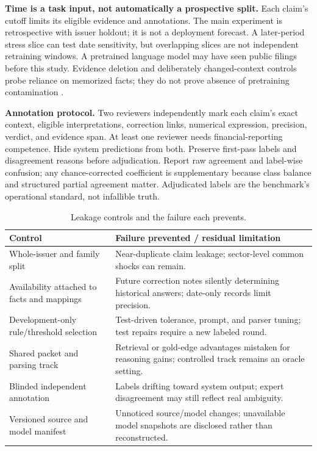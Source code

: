 \documentclass[11pt,a4paper]{article}
\newcommand{\lead}[1]{\textbf{\color{navy}#1}}
\begin{document}
\lead{Time is a task input, not automatically a prospective split.} Each claim's cutoff limits its eligible evidence and annotations. The main experiment is retrospective with issuer holdout; it is not a deployment forecast. A later-period stress slice can test date sensitivity, but overlapping slices are not independent retraining windows. A pretrained language model may have seen public filings before this study. Evidence deletion and deliberately changed-context controls probe reliance on memorized facts; they do not prove absence of pretraining contamination \cite{kapoor}.

\lead{Annotation protocol.} Two reviewers independently mark each claim's exact context, eligible interpretations, correction links, numerical expression, precision, verdict, and evidence span. At least one reviewer needs financial-reporting competence. Hide system predictions from both. Preserve first-pass labels and disagreement reasons before adjudication. Report raw agreement and label-wise confusion; any chance-corrected coefficient is supplementary because class balance and structured partial agreement matter. Adjudicated labels are the benchmark's operational standard, not infallible truth.

\begin{table}[H]\caption{Leakage controls and the failure each prevents.}
\small\begin{tabularx}{\linewidth}{YY}\toprule
Control & Failure prevented / residual limitation\\\midrule
Whole-issuer and family split & Near-duplicate claim leakage; sector-level common shocks can remain.\\
Availability attached to facts and mappings & Future correction notes silently determining historical answers; date-only records limit precision.\\
Development-only rule/threshold selection & Test-driven tolerance, prompt, and parser tuning; test repairs require a new labeled round.\\
Shared packet and parsing track & Retrieval or gold-edge advantages mistaken for reasoning gains; controlled track remains an oracle setting.\\
Blinded independent annotation & Labels drifting toward system output; expert disagreement may still reflect real ambiguity.\\
Versioned source and model manifest & Unnoticed source/model changes; unavailable model snapshots are disclosed rather than reconstructed.\\\bottomrule
\end{tabularx}\end{table}
\end{document}
